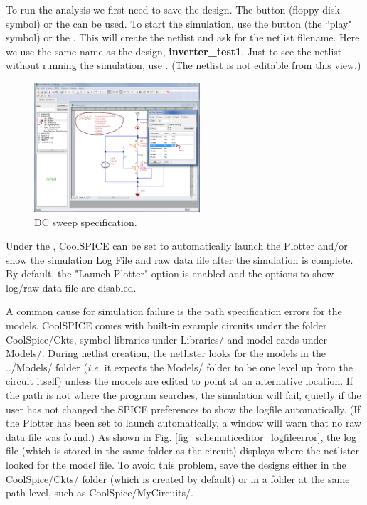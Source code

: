  To run the analysis we first need to save the design.  The  button (floppy disk symbol) or the  can be used.  To start the simulation, use the  button  (the ``play" symbol) or the .  This will create the netlist and ask for the netlist filename.  Here we use the same name as the design, \textsf{\textbf{inverter\_test1}}.  Just to see the netlist without running the simulation, use .  (The netlist is not editable from this view.)

\begin{figure}
    \includegraphics[width=0.55\textwidth]{./figures/getting_started_figures/SchematicEditor_DCrunadded.png}
    \caption{{DC sweep specification.}}
  \label{fig_schematiceditor_analysistool}
\end{figure} 


%
Under the , {CoolSPICE} can be set to automatically launch the Plotter and/or show the simulation Log File and raw data file after the simulation is complete.  By default, the "Launch Plotter" option is enabled and the options to show log/raw data file are disabled. 

 A common cause for simulation failure is the path specification errors for the models.  CoolSPICE comes with built-in example circuits under the folder \textsf{CoolSpice/Ckts}, symbol libraries under \textsf{Libraries/} and model cards under \textsf{Models/}.  During netlist creation, the netlister looks for the models in the \textsf{../Models/} folder (\textit{i.e.} it expects the \textsf{Models/} folder to be one level up from the circuit itself) unless the models are edited to point at an alternative location.  If the path is not where the program searches, the simulation will fail, quietly if the user has not changed the SPICE preferences to show the logfile automatically.  (If the Plotter has been set to launch automatically, a window will warn that no raw data file was found.) As shown in Fig. \ref{fig_schematiceditor_logfileerror}, the log file (which is stored in the same folder as the circuit) displays where the netlister looked for the model file.  To avoid this problem, save the designs either in the \textsf{CoolSpice/Ckts/} folder (which is created by default) or in a folder at the same path level, such as \textsf{CoolSpice/MyCircuits/}. 

